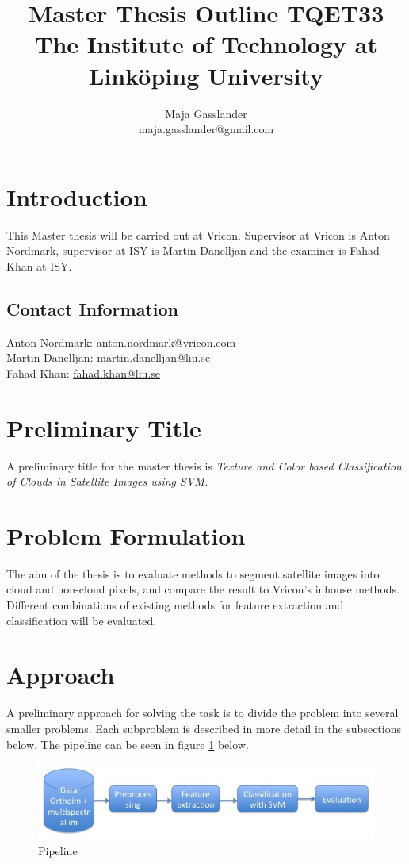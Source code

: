 \documentclass{article}
\title{Master Thesis Outline TQET33 \\
\normalsize{The Institute of Technology at Linköping University}}
\author{Maja Gasslander \\ \normalsize{maja.gasslander@gmail.com}}
\begin{document}
\maketitle
\newpage
\section{Introduction}
This Master thesis will be carried out at Vricon. Supervisor at Vricon is Anton Nordmark, supervisor at ISY is Martin Danelljan and the examiner is Fahad Khan at ISY. 

\subsection{Contact Information}
Anton Nordmark: \href{mailto:anton.nordmark@vricon.com}{anton.nordmark@vricon.com}\\
Martin Danelljan: \href{mailto:martin.danelljan@liu.se}{martin.danelljan@liu.se} \\
Fahad Khan: \href{mailto:fahad.khan@liu.se}{fahad.khan@liu.se}


\section{Preliminary Title}
A preliminary title for the master thesis is \emph{Texture and Color based Classification of Clouds in Satellite Images using SVM.} 

\section{Problem Formulation}
The aim of the thesis is to evaluate methods to segment satellite images into cloud and non-cloud pixels, and compare the result to Vricon's inhouse methods. Different combinations of existing methods for feature extraction and classification will be evaluated.

\section{Approach}
A preliminary approach for solving the task is to divide the problem into several smaller problems. Each subproblem is described in more detail in the subsections below. The pipeline can be seen in figure \ref{fig:pipeline} below.

\begin{figure}[h!]
    \centering
    \includegraphics[scale=0.5]{fig/pipeline}
    \caption{Pipeline}
    \label{fig:pipeline}
\end{figure}
\end{document}
